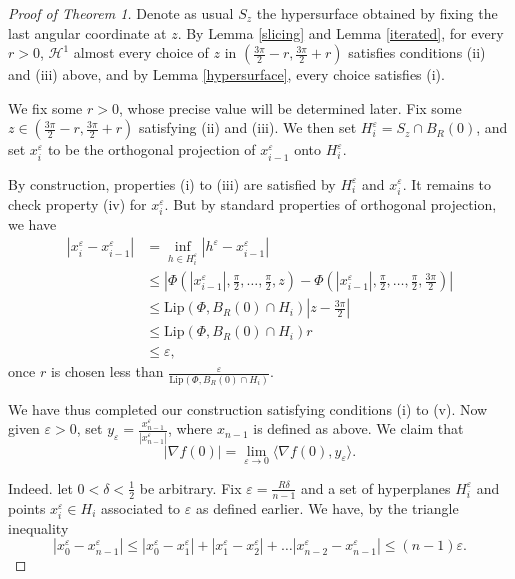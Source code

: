 \documentclass{article}
\begin{document}
\begin{proof}[Proof of Theorem 1]
\noindent Denote as usual $S_z$ the hypersurface obtained by fixing the last angular coordinate at $z$. By Lemma \ref{slicing} and Lemma \ref{iterated}, for every $r > 0$, $\mathcal H^1$ almost every choice of $z$ in $(\frac{3\pi}{2} - r, \frac{3\pi}{2}+r)$ satisfies conditions (ii) and (iii) above, and by Lemma \ref{hypersurface}, every choice satisfies (i). 

\noindent We fix some $r > 0$, whose precise value will be determined later. Fix some $z \in (\frac{3\pi}{2} - r, \frac{3\pi}{2} + r)$ satisfying (ii) and (iii). We then set $H^\varepsilon_i = S_{z} \cap B_R(0)$, and set $x^\varepsilon_i$ to be the orthogonal projection of $x^\varepsilon_{i-1}$ onto $H^\varepsilon_i$.

\noindent By construction, properties (i) to (iii) are satisfied by $H^\varepsilon_i$ and $x^\varepsilon_i$. It remains to check property (iv) for $x^\varepsilon_i$. But by standard properties of orthogonal projection, we have
$$\begin{aligned}|x^\varepsilon_i - x^\varepsilon_{i-1}| &= \inf_{h \in H^\varepsilon_i} |h^\varepsilon - x^\varepsilon_{i-1}| \\
& \leq\left |\Phi(|x^\varepsilon_{i-1}|, \frac{\pi}{2}, \dots, \frac{\pi}{2}, z) - \Phi(|x^\varepsilon_{i-1}|, \frac{\pi}{2}, \dots, \frac{\pi}{2}, \frac{3\pi}{2}) \right|\\
& \leq \text {Lip}(\Phi, B_R (0) \cap H_i) |z - \frac{3\pi}{2}| \\
& \leq \text{Lip}(\Phi, B_R (0) \cap H_i) r \\
& \leq \varepsilon,\end{aligned}$$
once $r$ is chosen less than $\frac{\varepsilon}{\text{Lip}(\Phi, B_R (0) \cap H_i)}$.

\noindent We have thus completed our construction satisfying conditions (i) to (v). Now given $\varepsilon > 0$, set $y_{\varepsilon} = \frac{x^\varepsilon_{n-1}}{|x^\varepsilon_{n-1}|}$, where $x_{n-1}$ is defined as above. We claim that
\begin{equation}\label{limit}|\nabla f(0)| = \lim_{\varepsilon \to 0} \langle \nabla f(0), y_\varepsilon \rangle.\end{equation}

\noindent Indeed. let $0 < \delta < \frac{1}{2}$ be arbitrary. Fix $\varepsilon = \frac{R\delta}{n-1}$ and a set of hyperplanes $H^\varepsilon_i$ and points $x^\varepsilon_i \in H_i$ associated to $\varepsilon$ as defined earlier. We have, by the triangle inequality
$$|x^\varepsilon_0 - x^\varepsilon_{n-1}| \leq |x^\varepsilon_0 - x^\varepsilon_1| + |x^\varepsilon_1 - x^\varepsilon_2| + \dots |x^\varepsilon_{n-2} - x^\varepsilon_{n-1}| \leq (n-1)\varepsilon.$$


\end{proof}
\end{document}

